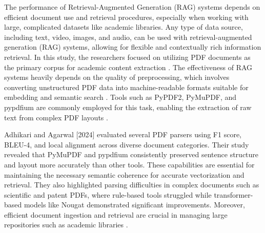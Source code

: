 \begin{refsection}
\hspace{1cm}The performance of Retrieval-Augmented Generation (RAG) systems depends on efficient document use and retrieval procedures, especially when working with large, complicated datasets like academic libraries. Any type of data source, including text, video, images, and audio, can be used with retrieval-augmented generation (RAG) systems, allowing for flexible and contextually rich information retrieval. In this study, the researchers focused on utilizing PDF documents as the primary corpus for academic content extraction \cite{li2023extracting}. The effectiveness of RAG systems heavily depends on the quality of preprocessing, which involves converting unstructured PDF data into machine-readable formats suitable for embedding and semantic search \cite{arzideh2024miracle} \cite{aquino2024extracting}. Tools such as PyPDF2, PyMuPDF, and pypdfium are commonly employed for this task, enabling the extraction of raw text from complex PDF layouts \cite{adhikari2024comparative}.

\bigbreak
\hspace{0.4cm}Adhikari and Agarwal [2024] evaluated several PDF parsers using F1 score, BLEU-4, and local alignment across diverse document categories. Their study revealed that PyMuPDF and pypdfium consistently preserved sentence structure and layout more accurately than other tools. These capabilities are essential for maintaining the necessary semantic coherence for accurate vectorization and retrieval. They also highlighted parsing difficulties in complex documents such as scientific and patent PDFs, where rule-based tools struggled while transformer-based models like Nougat demonstrated significant improvements. Moreover, efficient document ingestion and retrieval are crucial in managing large repositories such as academic libraries \cite{adhikari2024comparative}. 


\end{refsection}
